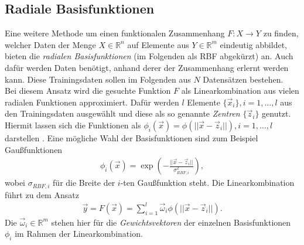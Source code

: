 \subsection{Radiale Basisfunktionen}
Eine weitere Methode um einen funktionalen Zusammenhang $F : X \rightarrow Y$ zu finden, welcher Daten der Menge $X \in \mathbb{R}^n$ auf Elemente aus $Y \in \mathbb{R}^m$ eindeutig abbildet, bieten die \textit{radialen Basisfunktionen} (im Folgenden als \textsc{RBF} abgekürzt) an. Auch dafür werden Daten benötigt, anhand derer der Zusammenhang erlernt werden kann. Diese Trainingsdaten sollen im Folgenden aus $N$ Datensätzen bestehen.\\

Bei diesem Ansatz wird die gesuchte Funktion $F$ als Linearkombination aus vielen radialen Funktionen approximiert. Dafür werden $l$ Elemente $\{\vec{x}_i\}, i=1,...,l$ aus den Trainingsdaten ausgewählt und diese als so genannte \textit{Zentren} $\{\vec{z}_i\}$ genutzt. Hiermit lassen sich die Funktionen als $\phi_i(\vec{x}) = \phi(||\vec{x}-\vec{z}_i||), i=1,\ldots ,l$ darstellen \citep{lowe2multi}. Eine mögliche Wahl der Basisfunktionen sind zum Beispiel Gaußfunktionen
\begin{align*}
\phi_i(\vec{x}) = \exp \left( - \frac{||\vec{x}-\vec{z}_i||}{\sigma_{RBF, i}^2} \right),
\end{align*}
wobei $\sigma_{RBF, i}$ für die Breite der $i$-ten Gaußfunktion steht.
Die Linearkombination führt zu dem Ansatz 
\begin{align}
\label{eq:rbf_lincomb}
\vec{y} = F(\vec{x}) = \sum^l_{i=1} \vec{\omega}_i \phi(||\vec{x} - \vec{z}_i||).
\end{align}
Die $\vec{\omega}_i \in \mathbb{R}^m$ stehen hier für die \textit{Gewichtsvektoren} der einzelnen Basisfunktionen $\phi_i$ im Rahmen der Linearkombination.\\

